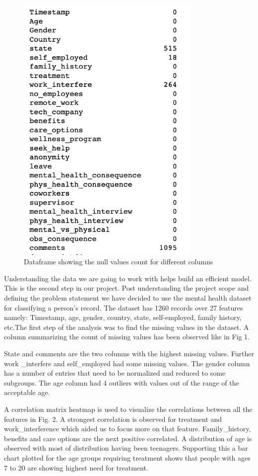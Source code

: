\documentclass[10pt,journal,compsoc]{IEEEtran}
\begin{document}
\begin{figure}[!t]
\centering
\includegraphics[width=3.5in]{5.png}
\caption{Dataframe showing the null values count for different columns}
\end{figure}

\quad Understanding the data we are going to work with helps build an efficient model. This is the second step in our project. Post understanding the project scope and defining the problem statement we have decided to use the mental health dataset for classifying a person's record. The dataset has 1260 records over 27 features namely: Timestamp, age, gender, country, state, self-employed, family history, etc.The first step of the analysis was to find the missing values in the dataset. A column summarizing the count of missing values has been observed like in Fig 1.


\quad State and comments are the two columns with the highest missing values. Further work \_interfere and self\_employed had some missing values. The gender column has a number of entries that need to be normalized and reduced to some subgroups. The age column had 4 outliers with values out of the range of the acceptable age. 

\quad A correlation matrix heatmap is used to visualize the correlations between all the features in Fig. 2. A strongest correlation is observed for treatment and work\_interference which aided us to focus more on that feature. Family\_history, benefits and care options are the next positive correlated. A distribution of age is observed with most of distribution having been teenagers. Supporting this a bar chart plotted for the age groups requiring treatment shows that people with ages 7 to 20 are showing highest need for treatment.
\end{document}
